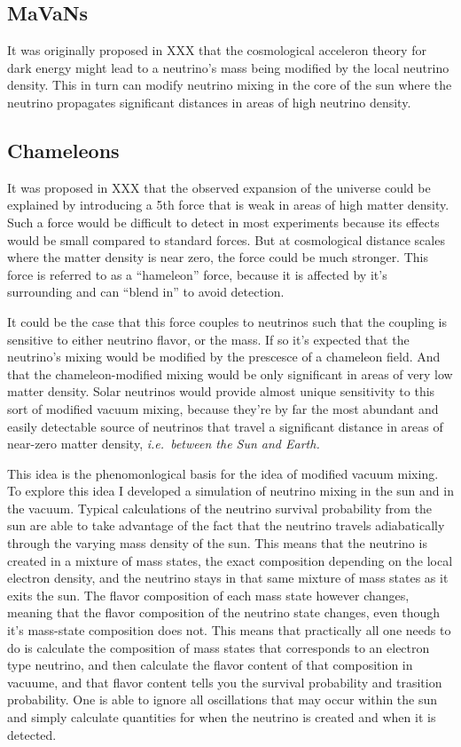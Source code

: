 \subsection{MaVaNs}
It was originally proposed in XXX that the cosmological acceleron theory for dark
energy might lead to a neutrino's mass being modified by the local neutrino density.
This in turn can modify neutrino mixing in the core of the sun where the neutrino
propagates significant distances in areas of high neutrino density.


\subsection{Chameleons}
It was proposed in XXX that the observed expansion
of the universe could be explained by introducing a 5th force that is weak
in areas of high matter density. Such a force would be difficult to detect
in most experiments because its effects would be small compared to standard
forces. But at cosmological distance scales where the matter density is near
zero, the force could be much stronger. This force is referred to as a ``hameleon''
force, because it is affected by it's surrounding and can ``blend in'' to avoid
detection.

It could be the case that this force couples to neutrinos such that the coupling
is sensitive to either neutrino flavor, or the mass. If so it's expected that the
neutrino's mixing would be modified by the prescesce of a chameleon field.
And that the chameleon-modified mixing would be only significant in areas of very
low matter density.
Solar neutrinos would provide almost unique sensitivity to this sort of modified
vacuum mixing, because they're by far the most abundant and easily detectable source
of neutrinos that travel a significant distance in areas of near-zero matter
density, \it i.e.\ between the Sun and Earth.

This idea is the phenomonlogical basis for the idea of modified vacuum mixing.
To explore this idea I developed a simulation of neutrino mixing in the sun and in
the vacuum. Typical calculations of the neutrino survival probability from
the sun are able to take advantage of the fact that the neutrino travels adiabatically
through the varying mass density of the sun. This means that the neutrino is
created in a mixture of mass states, the exact composition depending on the local
electron density, and the neutrino stays in that same mixture of mass states
as it exits the sun. The flavor composition of each mass state however changes,
meaning that the flavor composition of the neutrino state changes, even though
it's mass-state composition does not.
This means that practically all one needs to do is calculate the composition
of mass states that corresponds to an electron type neutrino, and then calculate
the flavor content of that composition in vacuume, and that flavor content
tells you the survival probability and trasition probability. One is able to
ignore all oscillations that may occur within the sun and simply calculate
quantities for when the neutrino is created and when it is detected.

